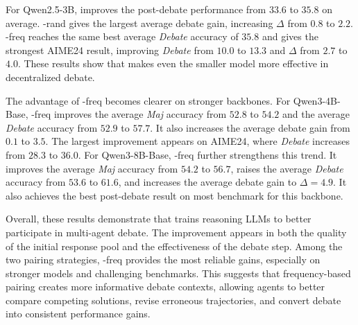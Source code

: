 For Qwen2.5-3B, \SDRL{} improves the post-debate performance from $33.6$ to $35.8$ on average. \SDRL{}-rand gives the largest average debate gain, increasing $\Delta$ from $0.8$ to $2.2$. \SDRL{}-freq reaches the same best average \textit{Debate} accuracy of $35.8$ and gives the strongest AIME24 result, improving \textit{Debate} from $10.0$ to $13.3$ and $\Delta$ from $2.7$ to $4.0$. These results show that \SDRL{} makes even the smaller model more effective in decentralized debate.

The advantage of \SDRL{}-freq becomes clearer on stronger backbones. For Qwen3-4B-Base, \SDRL{}-freq improves the average \textit{Maj} accuracy from $52.8$ to $54.2$ and the average \textit{Debate} accuracy from $52.9$ to $57.7$. It also increases the average debate gain from $0.1$ to $3.5$. The largest improvement appears on AIME24, where \textit{Debate} increases from $28.3$ to $36.0$. For Qwen3-8B-Base, \SDRL{}-freq further strengthens this trend. It improves the average \textit{Maj} accuracy from $54.2$ to $56.7$, raises the average \textit{Debate} accuracy from $53.6$ to $61.6$, and increases the average debate gain to $\Delta=4.9$. It also achieves the best post-debate result on most benchmark for this backbone.

Overall, these results demonstrate that \SDRL{} trains reasoning LLMs to better participate in multi-agent debate. The improvement appears in both the quality of the initial response pool and the effectiveness of the debate step. Among the two pairing strategies, \SDRL{}-freq provides the most reliable gains, especially on stronger models and challenging benchmarks. This suggests that frequency-based pairing creates more informative debate contexts, allowing agents to better compare competing solutions, revise erroneous trajectories, and convert debate into consistent performance gains.

